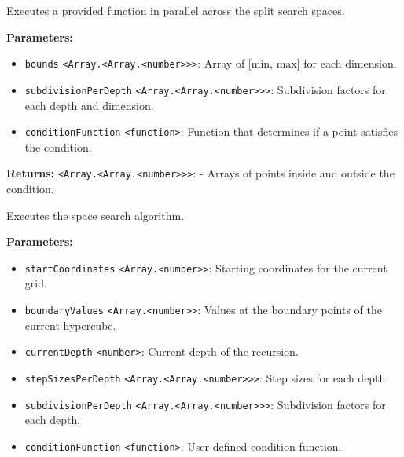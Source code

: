 \documentclass[12pt,a4paper]{article}
\begin{document}
\noindent Executes a provided function in parallel across the split search spaces.

\vspace{5mm}
\noindent {}


\noindent \textbf{Parameters:}
\begin{itemize}
  \item \texttt{bounds} \texttt{<Array.<Array.<number>>>}: Array of [min, max] for each dimension.
  \item \texttt{subdivisionPerDepth} \texttt{<Array.<Array.<number>>>}: Subdivision factors for each depth and dimension.
  \item \texttt{conditionFunction} \texttt{<function>}: Function that determines if a point satisfies the condition.
\end{itemize}

\noindent \textbf{Returns:} \texttt{<Array.<Array.<number>>>}: - Arrays of points inside and outside the condition.

\noindent Executes the space search algorithm.

\vspace{5mm}
\noindent {}


\noindent \textbf{Parameters:}
\begin{itemize}
  \item \texttt{startCoordinates} \texttt{<Array.<number>>}: Starting coordinates for the current grid.
  \item \texttt{boundaryValues} \texttt{<Array.<number>>}: Values at the boundary points of the current hypercube.
  \item \texttt{currentDepth} \texttt{<number>}: Current depth of the recursion.
  \item \texttt{stepSizesPerDepth} \texttt{<Array.<Array.<number>>>}: Step sizes for each depth.
  \item \texttt{subdivisionPerDepth} \texttt{<Array.<Array.<number>>>}: Subdivision factors for each depth.
  \item \texttt{conditionFunction} \texttt{<function>}: User-defined condition function.
\end{itemize}
\end{document}

